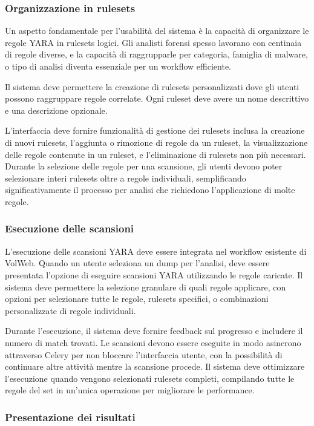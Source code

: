 \subsubsection{Organizzazione in rulesets}

Un aspetto fondamentale per l'usabilità del sistema è la capacità di organizzare le regole YARA in rulesets logici. Gli analisti forensi spesso lavorano con centinaia di regole diverse, e la capacità di raggrupparle per categoria, famiglia di malware, o tipo di analisi diventa essenziale per un workflow efficiente.

Il sistema deve permettere la creazione di rulesets personalizzati dove gli utenti possono raggruppare regole correlate. Ogni ruleset deve avere un nome descrittivo e una descrizione opzionale.

L'interfaccia deve fornire funzionalità di gestione dei rulesets inclusa la creazione di nuovi rulesets, l'aggiunta o rimozione di regole da un ruleset, la visualizzazione delle regole contenute in un ruleset, e l'eliminazione di rulesets non più necessari. Durante la selezione delle regole per una scansione, gli utenti devono poter selezionare interi rulesets oltre a regole individuali, semplificando significativamente il processo per analisi che richiedono l'applicazione di molte regole.

\subsubsection{Esecuzione delle scansioni}

L'esecuzione delle scansioni YARA deve essere integrata nel workflow esistente di VolWeb. Quando un utente seleziona un dump per l'analisi, deve essere presentata l'opzione di eseguire scansioni YARA utilizzando le regole caricate. Il sistema deve permettere la selezione granulare di quali regole applicare, con opzioni per selezionare tutte le regole, rulesets specifici, o combinazioni personalizzate di regole individuali.

Durante l'esecuzione, il sistema deve fornire feedback sul progresso e includere il numero di match trovati. Le scansioni devono essere eseguite in modo asincrono attraverso Celery per non bloccare l'interfaccia utente, con la possibilità di continuare altre attività mentre la scansione procede. Il sistema deve ottimizzare l'esecuzione quando vengono selezionati rulesets completi, compilando tutte le regole del set in un'unica operazione per migliorare le performance.

\subsubsection{Presentazione dei risultati}

